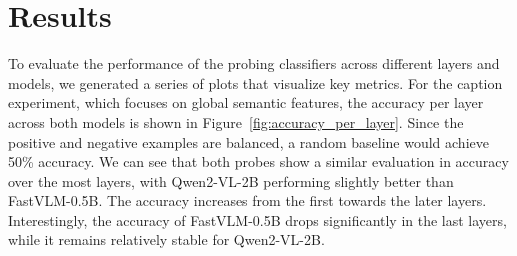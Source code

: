 \documentclass[11pt]{article}
\begin{document}
\section{Results}
To evaluate the performance of the probing classifiers across different layers
and models, we generated a series of plots that visualize key metrics.
For the caption experiment, which focuses on global semantic features, the accuracy per layer
across both models is shown in Figure~\ref{fig:accuracy_per_layer}.
Since the positive and negative examples are balanced, a random baseline would achieve 50\% accuracy.
We can see that both probes show a similar evaluation in accuracy over the most layers, with Qwen2-VL-2B performing slightly better than FastVLM-0.5B.
The accuracy increases from the first towards the later layers.
Interestingly, the accuracy of FastVLM-0.5B drops significantly in the last layers, while it remains relatively stable for Qwen2-VL-2B.
\end{document}
